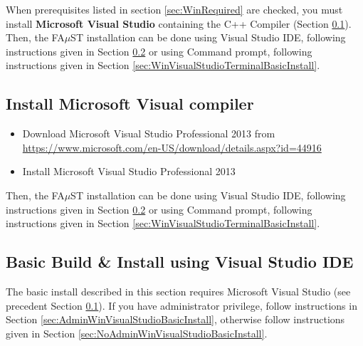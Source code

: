 When prerequisites listed in section \ref{sec:WinRequired} are checked, you must install \textbf{Microsoft Visual Studio} containing the C++ Compiler (Section \ref{sec:WinInstallCompilerVS}).
Then, the FA$\mu$ST installation can be done using Visual Studio IDE, following instructions given in Section \ref{sec:WinVisualStudioBasicInstall} or using Command prompt, following instructions given in Section \ref{sec:WinVisualStudioTerminalBasicInstall}. 



\subsection{Install Microsoft Visual compiler}\label{sec:WinInstallCompilerVS} 

\begin{itemize}
\item Download Microsoft Visual Studio Professional 2013 from \url{https://www.microsoft.com/en-US/download/details.aspx?id=44916}
\item Install Microsoft Visual Studio Professional 2013
\end{itemize}
Then, the FA$\mu$ST installation can be done using Visual Studio IDE, following instructions given in Section \ref{sec:WinVisualStudioBasicInstall} or using Command prompt, following instructions given in Section \ref{sec:WinVisualStudioTerminalBasicInstall}. 

\subsection{Basic Build \& Install using Visual Studio IDE}\label{sec:WinVisualStudioBasicInstall}
The basic install described in this section requires Microsoft Visual Studio (see precedent Section \ref{sec:WinInstallCompilerVS}).
If you have administrator privilege, follow instructions in Section \ref{sec:AdminWinVisualStudioBasicInstall}, otherwise follow instructions given in Section \ref{sec:NoAdminWinVisualStudioBasicInstall}.

